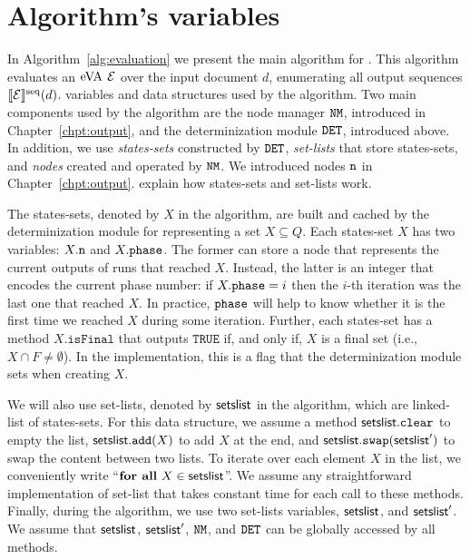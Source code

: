 \section{Algorithm's variables} 
In Algorithm~\ref{alg:evaluation} we present the main algorithm for \rematch.
This algorithm evaluates an $\mathrm{eVA}$ $\mathcal{E}$ over the input document $d$,
enumerating all output sequences $\llbracket\mathcal{E}\rrbracket^{\operatorname{seq}}(d)$. %
variables and data structures used by the algorithm.
%
Two main components used by the algorithm are the node manager $\mathtt{NM}$, introduced
in Chapter~\ref{chpt:output}, and the determinization module $\mathtt{DET}$, introduced
above. In addition, we use \emph{states-sets} constructed by $\mathtt{DET}$,
\emph{set-lists} that store states-sets, and \emph{nodes} created and operated
by $\mathtt{NM}$. We introduced nodes $\mathtt{n}$ in Chapter~\ref{chpt:output}. %
explain how states-sets and set-lists work.

The states-sets, denoted by $X$ in the algorithm, are built and cached by the
determinization module for representing a set $X \subseteq Q$. Each states-set
$X$ has two variables: $X.\mathtt{n}$ and $X.\texttt{phase}$. The former can store a node
that represents the current outputs of runs that reached $X$. Instead, the
latter is an integer that encodes the current phase number: if $X.\texttt{phase} = i$
then the $i$-th iteration was the last one that reached $X$. In practice,
$\texttt{phase}$ will help to know whether it is the first time we reached $X$ during
some iteration. Further, each states-set has a method $X.\texttt{isFinal}$ that
outputs $\texttt{TRUE}$ if, and only if, $X$ is a final set (i.e., $X \cap F
\neq \emptyset$). In the implementation, this is a flag that the determinization
module sets when creating $X$.

We will also use set-lists, denoted by $\textsf{setslist}$ in the algorithm, which
are linked-list of states-sets. For this data structure, we assume a method
$\textsf{setslist}.\texttt{clear}$ to empty the list,
$\textsf{setslist}.\texttt{add}(X)$ to add $X$ at the end, and
$\textsf{setslist}.\texttt{swap}(\textsf{setslist}')$ to swap the content between two
lists. To iterate over each element $X$ in the list, we conveniently write
``$\textbf{for all} \ X \in \textsf{setslist}$''. We assume any straightforward
implementation of set-list that takes constant time for each call to these
methods. Finally, during the algorithm, we use two set-lists variables,
$\textsf{setslist}$, and $\textsf{setslist}'$. We assume that $\textsf{setslist}$,
$\textsf{setslist}'$, $\mathtt{NM}$, and $\mathtt{DET}$ can be globally accessed by all methods.

